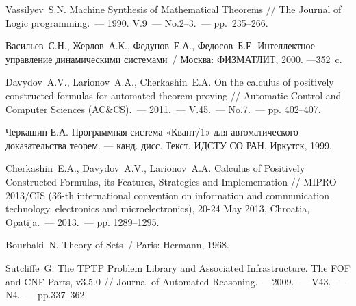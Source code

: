 \documentclass[a4paper]{jctart15b}
\begin{document}
\begin{thebibliography}{9}

 {\sc Vassilyev~S.N.}
Machine Synthesis of Mathematical Theorems // The Journal of Logic programming.~--- 1990. V.9~--- No.2--3.~--- pp.~235--266.

 {\sc Васильев~С.Н., Жерлов~А.К., Федунов~Е.А., Федосов~Б.Е.}
Интеллектное управление динамическими системами~/ Москва: ФИЗМАТЛИТ, 2000. ---352~c.

 {\sc Davydov~A.V., Larionov~A.A., Cherkashin~E.A.}
On the calculus of positively constructed formulas for automated theorem proving // Automatic Control and Computer Sciences (AC\&CS).~--- 2011.~--- V.45.~--- No.7.~--- pp. 402--407.

{\sc Черкашин Е.А.} Программная система «Квант/1» для автоматического доказательства теорем. --- канд. дисс. Текст. ИДСТУ СО РАН, Иркутск, 1999.

 {\sc Cherkashin~E.A., Davydov~A.V., Larionov~A.A.}
Calculus of Positively Constructed Formulas, its Features, Strategies and Implementation // MIPRO 2013/CIS (36-th international convention on information and communication technology, electronics and microelectronics), 20-24 May 2013, Chroatia, Opatija.~--- 2013.~--- pp. 1289--1295.

 {\sc Bourbaki~N.}
Theory of Sets~/ Paris: Hermann, 1968.

 {\sc Sutcliffe~G.}
The TPTP Problem Library and Associated Infrastructure. The FOF and CNF Parts, v3.5.0 // Journal of Automated Reasoning.~---2009.~--- V43.~--- N4.~--- pp.337--362.


\end{thebibliography}
\end{document}
